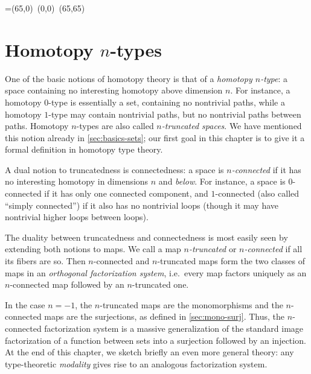 \bgroup %

\newbox\pbbox
\setbox\pbbox=\hbox{\xy \POS(65,0)\ar@{-} (0,0) \ar@{-} (65,65)\endxy}
\def\pb{\save[]+<3.5mm,-3.5mm>*{\copy\pbbox} \restore}

\newcommand{\comp}[2]{\ensuremath{{#2} \circ {#1}}}
\newcommand{\istype}[1]{\mathsf{is}\mbox{-}{#1}\mbox{-}\mathsf{type}}
\newcommand{\nplusone}{\ensuremath{(n+1)}}
\newcommand{\nminusone}{\ensuremath{(n-1)}}
\newcommand{\fact}{\textsf{fact}}


\chapter{Homotopy \texorpdfstring{$n$}{n}-types}
\label{cha:hlevels}

One of the basic notions of homotopy theory is that of a \emph{homotopy $n$-type}: a space containing no interesting homotopy above dimension $n$.
For instance, a homotopy $0$-type is essentially a set, containing no nontrivial paths, while a homotopy $1$-type may contain nontrivial paths, but no nontrivial paths between paths.
Homotopy $n$-types are also called \emph{$n$-truncated spaces}.
We have mentioned this notion already in \autoref{sec:basics-sets}; our first goal in this chapter is to give it a formal definition in homotopy type theory.

A dual notion to truncatedness is connectedness: a space is \emph{$n$-connected} if it has no interesting homotopy in dimensions $n$ and \emph{below}.
For instance, a space is $0$-connected if it has only one connected component, and $1$-connected (also called ``simply connected'') if it also has no nontrivial loops (though it may have nontrivial higher loops between loops).

The duality between truncatedness and connectedness is most easily seen by extending both notions to maps.
We call a map \emph{$n$-truncated} or \emph{$n$-connected} if all its fibers are so.
Then $n$-connected and $n$-truncated maps form the two classes of maps in an \emph{orthogonal factorization system}, i.e.\ every map factors uniquely as an $n$-connected map followed by an $n$-truncated one.

In the case $n=-1$, the $n$-truncated maps are the monomorphisms and the $n$-connected maps are the surjections, as defined in \autoref{sec:mono-surj}.
Thus, the $n$-connected factorization system is a massive generalization of the standard image factorization of a function between sets into a surjection followed by an injection.
At the end of this chapter, we sketch briefly an even more general theory: any type-theoretic \emph{modality} gives rise to an analogous factorization system.


